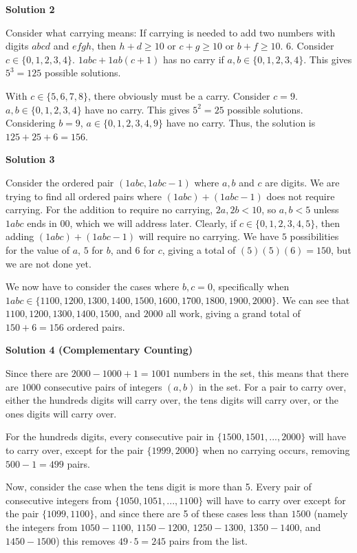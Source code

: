 \begin{enumerate}
\textbf{Solution 2}

Consider what carrying means: If carrying is needed to add two numbers with digits $abcd$ and $efgh$, then $h+d\ge 10$ or $c+g\ge 10$ or $b+f\ge 10$. 6.  Consider $c \in \{0, 1, 2, 3, 4\}$. $1abc + 1ab(c+1)$ has no carry if $a, b \in \{0, 1, 2, 3, 4\}$. This gives $5^3=125$ possible solutions. 

 With $c \in \{5, 6, 7, 8\}$, there obviously must be a carry. Consider $c = 9$. $a, b \in \{0, 1, 2, 3, 4\}$ have no carry. This gives $5^2=25$ possible solutions. Considering $b = 9$,  $a \in \{0, 1, 2, 3, 4, 9\}$ have no carry. Thus, the solution is $125 + 25 + 6=\boxed{156}$. 

 



\textbf{Solution 3}

Consider the ordered pair $(1abc , 1abc - 1)$ where $a,b$ and $c$ are digits. We are trying to find all ordered pairs where $(1abc) + (1abc - 1)$ does not require carrying. For the addition to require no carrying, $2a,2b < 10$, so $a,b < 5$ unless $1abc$ ends in $00$, which we will address later.  Clearly, if $c \in \{0, 1, 2, 3, 4 ,5\}$, then adding $(1abc) + (1abc - 1)$ will require no carrying. We have $5$ possibilities for the value of $a$, $5$ for $b$, and $6$ for $c$, giving a total of $(5)(5)(6) = 150$, but we are not done yet.

 We now have to consider the cases where $b,c = 0$, specifically when $1abc \in \{1100, 1200, 1300, 1400, 1500, 1600, 1700, 1800, 1900, 2000\}$. We can see that $1100, 1200, 1300, 1400, 1500$, and $2000$ all work, giving a grand total of $150 + 6 = \boxed{156}$ ordered pairs.

 



\textbf{Solution 4 (Complementary Counting)}

Since there are $2000-1000+1 = 1001$ numbers in the set, this means that there are $1000$ consecutive pairs of integers $(a, b)$ in the set. For a pair to carry over, either the hundreds digits will carry over, the tens digits will carry over, or the ones digits will carry over.

 For the hundreds digits, every consecutive pair in $\{1500, 1501, ..., 2000\}$ will have to carry over, except for the pair $\{1999, 2000\}$ when no carrying occurs, removing $500-1 = 499$ pairs. 

 Now, consider the case when the tens digit is more than 5. Every pair of consecutive integers from  $\{1050,1051, ..., 1100\}$ will have to carry over except for the pair $\{1099, 1100\}$, and since there are 5 of these cases less than $1500$ (namely the integers from $1050-1100$, $1150-1200$, $1250-1300$,  $1350-1400$, and $1450-1500$) this removes $49 \cdot 5 = 245$ pairs from the list. 


\end{enumerate}
